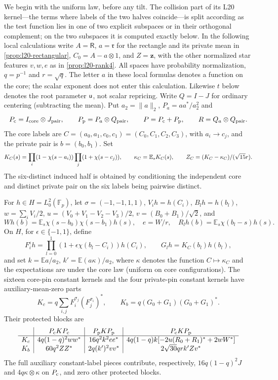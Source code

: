 We begin with the uniform law, before any tilt. The collision
part of its L20 kernel---the terms where labels of the two halves
coincide---is split according as the test function lies in one of
two explicit subspaces or in their orthogonal complement; on the
two subspaces it is computed exactly below.
In the following local calculations write $A=\mathsf R$, $a=\mathfrak r$
for the rectangle and its private mean in \cref{prop:l20-rectangular},
$C_0=A-a\otimes1$, and $Z=\boldsymbol z$, with the other normalized
star features $v,w,e$ as in \cref{prop:l20-rank4}. All spaces have
probability normalization, $q=p^{-1}$ and $r=\sqrt q$.
The letter $a$ in these local formulas denotes a function on the core;
the scalar exponent does not enter this calculation. Likewise $t$
below denotes the root parameter $\mathsf u$, not scalar repricing.
Write $Q=I-J$ for ordinary centering (subtracting the mean). Put $a_2=\|a\|_2$, $P_a=aa^*/a_2^2$ and
\[
 P_{\rm c}=I_{\rm core}\otimes J_{\rm pair},\qquad
 P_{\rm p}=P_a\otimes Q_{\rm pair},\qquad
 P=P_{\rm c}+P_{\rm p},\qquad R=Q_a\otimes Q_{\rm pair}.
\]
The core labels are $C=(a_0,a_1,c_0,c_1)=(C_0,C_1,C_2,C_3)$, with $a_i\to c_j$,
and the private pair is $b=(b_0,b_1)$. Set
\[
 K_C(s)=\prod_i(1-\chi(s-a_i))\prod_j(1+\chi(s-c_j)),
 \qquad\kappa_C=\mathbb E_sK_C(s),\qquad
 Z_C=(K_C-\kappa_C)/(\sqrt{15}r).
\]
The six-distinct induced half is obtained by conditioning the
independent core and distinct private pair on the six labels being pairwise distinct.

\begin{lemma}
\label{imp:local:pin-projections}
For $h\in H=L^2_0(\mathbb F_p)$, let $\sigma=(-1,-1,1,1)$, $V_i h=h(C_i)$,
$B_lh=h(b_l)$, $w=\sum_iV_i/2$, $u=(V_0+V_1-V_2-V_3)/2$,
$v=(B_0+B_1)/\sqrt2$, and
\[
 W h(b)=\mathbb E_s\chi(s-b_0)\chi(s-b_1)h(s),\quad e=W/r,
 \quad R_lh(b)=\mathbb E_s\chi(b_l-s)h(s).
\]
On $H$, for $\epsilon\in\{-1,1\}$, define
\[
 F_i^\epsilon h=\prod_{l=0}^1(1+\epsilon\chi(b_l-C_i))h(C_i),
 \qquad G_lh=K_C(b_l)h(b_l),
\]
and set $k=\mathbb E a/a_2$, $k'=\mathbb E(a\kappa)/a_2$,
where $\kappa$ denotes the function $C\mapsto\kappa_C$ and the
expectations are under the core law (uniform on core
configurations).
The sixteen core-pin constant kernels and the four private-pin
constant kernels have auxiliary-mean-zero parts
\[
 K_c=q\sum_{i,j}F_i^{\sigma_j}(F_j^{\sigma_i})^*,
 \qquad K_b=q(G_0+G_1)(G_0+G_1)^*.
\]
Their protected blocks are
\begin{equation}\label{eq:merge-local-I-14}
\begin{array}{c|c|c|c}
 &P_{\rm c}KP_{\rm c}&P_{\rm p}KP_{\rm p}&P_{\rm c}KP_{\rm p}\\ \hline
K_c&4q(1-q)^2ww^*&16q^2k^2ee^*
 &4q(1-q)k[-2u(R_0+R_1)^*+2wW^*]\\
K_b&60q^2ZZ^*&2q(k')^2vv^*&2\sqrt{30}qrk'Zv^*
\end{array}
\end{equation}
The full auxiliary constant-label pieces contribute, respectively,
$16q(1-q)^2J$ and $4q\kappa\otimes\kappa$ on $P_{\rm c}$, and zero
other protected blocks.
\end{lemma}

